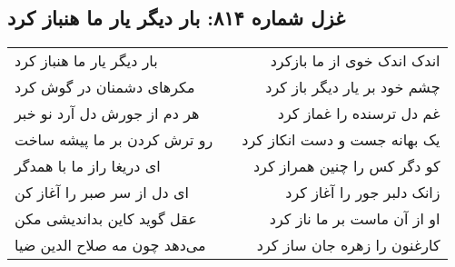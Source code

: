 \begin{center}
\section*{غزل شماره ۸۱۴: بار دیگر یار ما هنباز کرد}
\label{sec:0814}
\begin{longtable}{l p{0.5cm} r}
بار دیگر یار ما هنباز کرد
&&
اندک اندک خوی از ما بازکرد
\\
مکرهای دشمنان در گوش کرد
&&
چشم خود بر یار دیگر باز کرد
\\
هر دم از جورش دل آرد نو خبر
&&
غم دل ترسنده را غماز کرد
\\
رو ترش کردن بر ما پیشه ساخت
&&
یک بهانه جست و دست انکاز کرد
\\
ای دریغا راز ما با همدگر
&&
کو دگر کس را چنین همراز کرد
\\
ای دل از سر صبر را آغاز کن
&&
زانک دلبر جور را آغاز کرد
\\
عقل گوید کاین بداندیشی مکن
&&
او از آن ماست بر ما ناز کرد
\\
می‌دهد چون مه صلاح الدین ضیا
&&
کارغنون را زهره جان ساز کرد
\\
\end{longtable}
\end{center}
